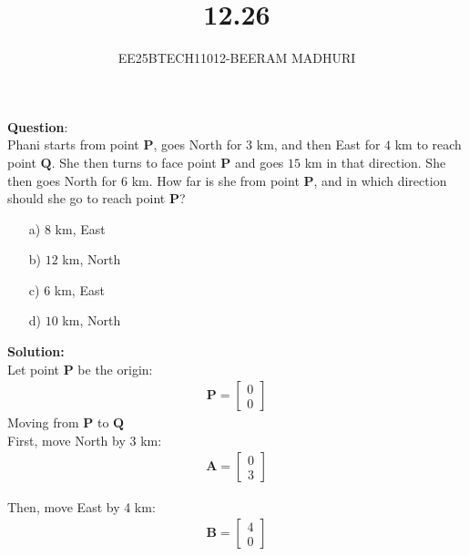 \documentclass[journal]{IEEEtran}
\begin{document}

\vspace{3cm}

\title{12.26}
\author{EE25BTECH11012-BEERAM MADHURI}
{\let\newpage\relax\maketitle}

\renewcommand{\thefigure}{\theenumi}
\renewcommand{\thetable}{\theenumi}
\setlength{\intextsep}{10pt} %


\renewcommand{\thetable}{\theenumi}


\textbf{Question}:\\
Phani starts from point $\mathbf{P}$, goes North for $3$ km, and then East for $4$ km to reach point $\mathbf{Q}$. She then turns to face point $\mathbf{P}$ and goes $15$ km in that direction. She then goes North for $6$ km. How far is she from point $\mathbf{P}$, and in which direction should she go to reach point $\mathbf{P}$?

\begin{enumerate}
    \item[a)] $8$ km, East
    \item[b)] $12$ km, North
    \item[c)] $6$ km, East
    \item[d)] $10$ km, North
\end{enumerate}
\textbf{Solution:}\\
Let point $\mathbf{P}$  be the origin:
\begin{align}
\mathbf{P} = \begin{bmatrix} 0 \\ 0 \end{bmatrix}
\end{align}
Moving from  $\mathbf{P}$ to $\mathbf{Q}$\\
First, move North by 3 km:
\begin{align}
\mathbf{A} = \begin{bmatrix} 0 \\ 3 \end{bmatrix}
\end{align}

Then, move East by 4 km:
\begin{align}
\mathbf{B} = \begin{bmatrix} 4 \\ 0 \end{bmatrix}
\end{align}
\end{document}
